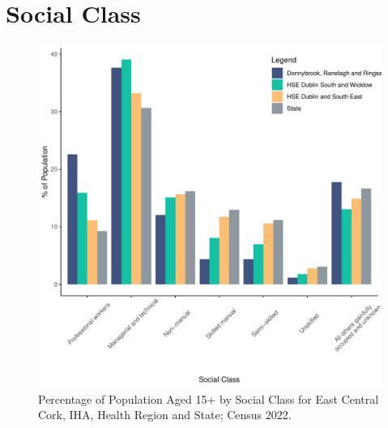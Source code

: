 \documentclass{article}
\begin{document}
\section{Social Class}\label{sect:SC}
\begin{figure}[H]
	\centering
	\includegraphics[width = 140mm]{../figures/SocialClassED.pdf}
	\caption{Percentage of Population Aged 15+ by Social Class for East Central Cork, IHA, Health Region and State; Census 2022.}
	\label{fig:vbnv}
	\end{figure}
\end{document}
